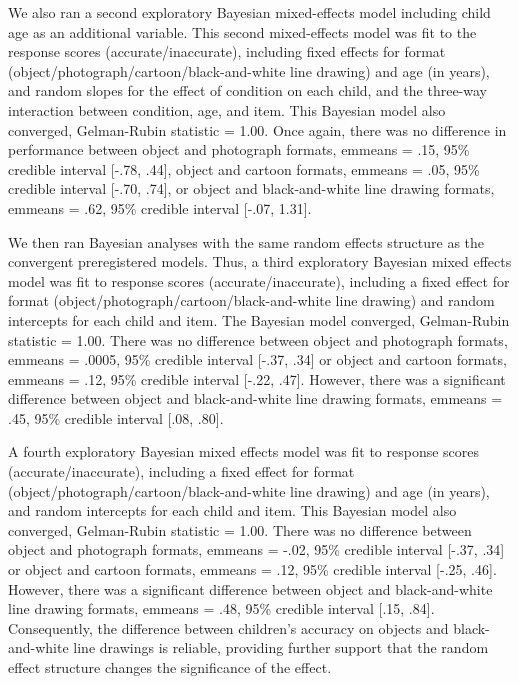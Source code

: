 \documentclass[10pt, letterpaper]{article}
\begin{document}
We also ran a second exploratory Bayesian mixed-effects model including
child age as an additional variable. This second mixed-effects model was
fit to the response scores (accurate/inaccurate), including fixed
effects for format (object/photograph/cartoon/black-and-white line
drawing) and age (in years), and random slopes for the effect of
condition on each child, and the three-way interaction between
condition, age, and item. This Bayesian model also converged,
Gelman-Rubin statistic = 1.00. Once again, there was no difference in
performance between object and photograph formats, emmeans = .15, 95\%
credible interval {[}-.78, .44{]}, object and cartoon formats, emmeans =
.05, 95\% credible interval {[}-.70, .74{]}, or object and
black-and-white line drawing formats, emmeans = .62, 95\% credible
interval {[}-.07, 1.31{]}.

We then ran Bayesian analyses with the same random effects structure as
the convergent preregistered models. Thus, a third exploratory Bayesian
mixed effects model was fit to response scores (accurate/inaccurate),
including a fixed effect for format
(object/photograph/cartoon/black-and-white line drawing) and random
intercepts for each child and item. The Bayesian model converged,
Gelman-Rubin statistic = 1.00. There was no difference between object
and photograph formats, emmeans = .0005, 95\% credible interval {[}-.37,
.34{]} or object and cartoon formats, emmeans = .12, 95\% credible
interval {[}-.22, .47{]}. However, there was a significant difference
between object and black-and-white line drawing formats, emmeans = .45,
95\% credible interval {[}.08, .80{]}.

A fourth exploratory Bayesian mixed effects model was fit to response
scores (accurate/inaccurate), including a fixed effect for format
(object/photograph/cartoon/black-and-white line drawing) and age (in
years), and random intercepts for each child and item. This Bayesian
model also converged, Gelman-Rubin statistic = 1.00. There was no
difference between object and photograph formats, emmeans = -.02, 95\%
credible interval {[}-.37, .34{]} or object and cartoon formats, emmeans
= .12, 95\% credible interval {[}-.25, .46{]}. However, there was a
significant difference between object and black-and-white line drawing
formats, emmeans = .48, 95\% credible interval {[}.15, .84{]}.
Consequently, the difference between children's accuracy on objects and
black-and-white line drawings is reliable, providing further support
that the random effect structure changes the significance of the effect.
\end{document}
